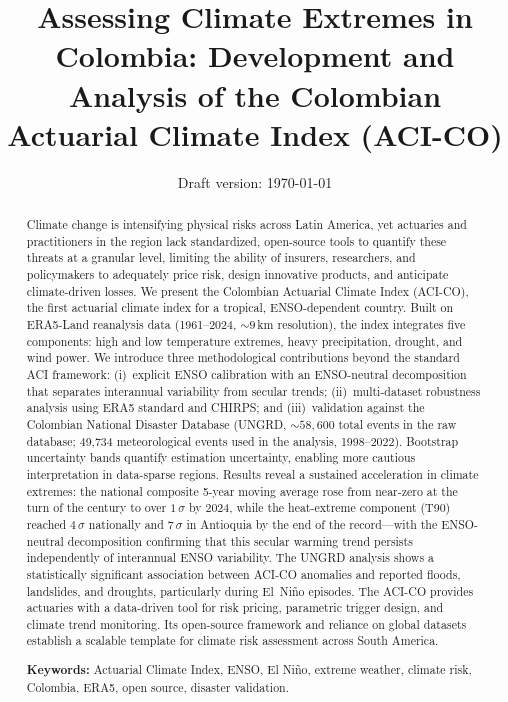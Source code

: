 \documentclass[12pt]{article}
\title{\textbf{Assessing Climate Extremes in Colombia: Development and Analysis of the Colombian Actuarial Climate Index (ACI-CO)}}
\date{Draft version: \today}
\begin{document}
\maketitle
\begin{abstract}
Climate change is intensifying physical risks across Latin America, yet actuaries and practitioners in the region lack standardized, open-source tools to quantify these threats at a granular level, limiting the ability of insurers, researchers, and policymakers to adequately price risk, design innovative products, and anticipate climate-driven losses. We present the Colombian Actuarial Climate Index (ACI-CO), the first actuarial climate index for a tropical, ENSO-dependent country. Built on ERA5-Land reanalysis data (1961--2024, ${\sim}9$\,km resolution), the index integrates five components: high and low temperature extremes, heavy precipitation, drought, and wind power. We introduce three methodological contributions beyond the standard ACI framework: (i)~explicit ENSO calibration with an ENSO-neutral decomposition that separates interannual variability from secular trends; (ii)~multi-dataset robustness analysis using ERA5 standard and CHIRPS; and (iii)~validation against the Colombian National Disaster Database (UNGRD, ${\sim}58{,}600$ total events in the raw database; 49{,}734 meteorological events used in the analysis, 1998--2022). Bootstrap uncertainty bands quantify estimation uncertainty, enabling more cautious interpretation in data-sparse regions. Results reveal a sustained acceleration in climate extremes: the national composite 5-year moving average rose from near-zero at the turn of the century to over $1\,\sigma$ by 2024, while the heat-extreme component (T90) reached $4\,\sigma$ nationally and $7\,\sigma$ in Antioquia by the end of the record---with the ENSO-neutral decomposition confirming that this secular warming trend persists independently of interannual ENSO variability. The UNGRD analysis shows a statistically significant association between ACI-CO anomalies and reported floods, landslides, and droughts, particularly during El~Ni\~no episodes. The ACI-CO provides actuaries with a data-driven tool for risk pricing, parametric trigger design, and climate trend monitoring. Its open-source framework and reliance on global datasets establish a scalable template for climate risk assessment across South America.
 
\medskip
\noindent\textbf{Keywords:} Actuarial Climate Index, ENSO, El Ni\~no, extreme weather, climate risk, Colombia, ERA5, open source, disaster validation.
\end{abstract}
 
\end{document}
